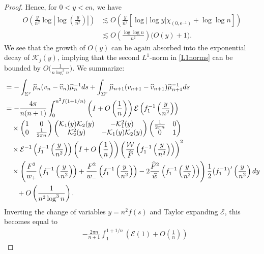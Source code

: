\documentclass[11pt]{article}
\numberwithin{equation}{section}
\newcommand{\Id}{I}
\newcommand{\cK}{\mathcal{K}}
\newcommand{\cE}{\mathcal{E}}
\newcommand{\cW}{\mathcal{W}}
\newcommand{\hw}{\widehat w}
\newcommand{\hmu}{{\widehat \mu}}
\newcommand{\bv}{v}
\newcommand{\hv}{{\widehat v}}
\newcommand{\hF}{\widehat F}
\newcommand{\hFw}{\frac{\hF^2}{\hw}}
\newcommand{\Sigr}{\Sigma^r}
\newcommand{\E}{\mathrm{e}}
\numberwithin{equation}{section}
\begin{document}
\begin{proof}
Hence, for $0 < y < cn$, we have
\begin{align*}
 O\left(\frac{y}{n^2}\log \left|\log \left( \frac{y}{n^2}\right)\right| \right)&\lesssim O\left( \frac{y}{n^2} \left[\log | \log y |\chi_{(0, \E^{-1})}+ \log \log n\right]\right)
 \\
 &\lesssim O\left(\frac{\log \log n}{n^2} \right) \big(O(y)+1\big).
\end{align*}
We see that the growth of $O(y)$ can be again absorbed into the exponential decay of $\cK_j(y)$, implying that the second $L^1$-norm in \eqref{L1norms} can be bounded by $O\big(\frac{1}{n \log^3 n}\big)$. We summarize:
\begin{align*}
 &= -\int_{\Sigr} \hmu_n(\bv_n-\hv_n)\hmu_n^{-1} {\rm d}s + \int_{\Sigr} \hmu_{n+1}(\bv_{n+1}-\hv_{n+1})\hmu^{-1}_{n+1} {\rm d}s
 \\
 &=-\frac{4\pi}{n(n+1)} \int_0^{n^2 f(1+1/n)} \left(\Id + O\left(\frac{1}{n}\right)\right)\cE\left(f_1^{-1}\left(\frac{y}{n^2}\right)\right)
 \\
 &\quad\times
 \begin{pmatrix}
 1 & 0
 \\
 0 & \frac{1}{2\pi n}
 \end{pmatrix}
 \begin{pmatrix}
 \cK_1(y)\cK_2(y) & -\cK^2_1(y)
 \\
 \cK^2_2(y) & -\cK_1(y)\cK_2(y)
 \end{pmatrix}
 \begin{pmatrix}
 \frac{1}{2\pi n} & 0
 \\
 0 & 1
 \end{pmatrix}
\\
&\quad\times\cE^{-1}\left(f_1^{-1}\left(\frac{y}{n^2}\right)\right)\left(\Id + O\left(\frac{1}{n}\right)\right)
 \left(\frac{\cW}{\hF}\left(f_1^{-1}\left(\frac{y}{n^2}\right)\right)\right)^2
 \\
 &\quad\times
 \left(\frac{F^2}{w_+}\left(f_1^{-1}\left(\frac{y}{n^2}\right)\right)+\frac{F^2}{w_-}\left(f_1^{-1}\left(\frac{y}{n^2}\right)\right)-2\hFw\left(f_1^{-1}\left(\frac{y}{n^2}\right)\right)\right)\frac{1}{2}\big(f_1^{-1}\big)'\left(\frac{y}{n^2}\right){\rm d}y
 \\
 &\phantom{\quad\times}{}+O\left(\frac{1}{n^2\log^3 n}\right).
\end{align*}
 Inverting the change of variables $y = n^2 f(s)$ and Taylor expanding $\cE$, this becomes equal to
\begin{align}
 &-\frac{2\pi n}{n+1} \int_1^{1+1/n} \left( \cE(1) + O\left( \frac{1}{n} \right)\right)

\end{align}
\end{proof}
\end{document}
